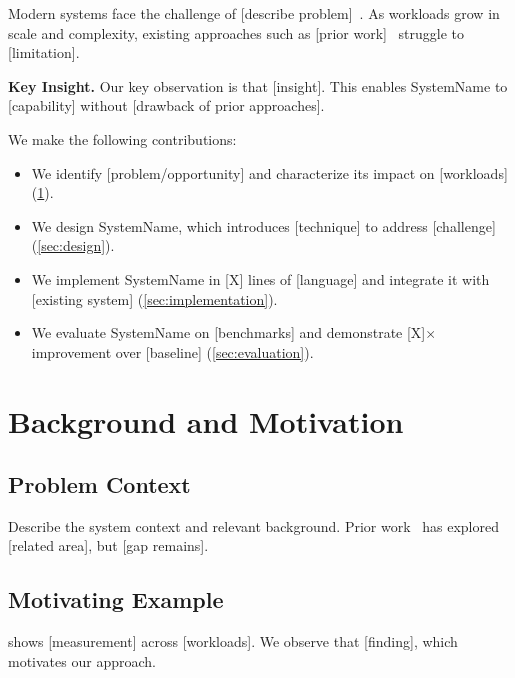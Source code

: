 \documentclass[letterpaper,twocolumn,10pt]{article}
\newcommand{\system}{SystemName\xspace}
\newcommand{\para}[1]{\smallskip\noindent\textbf{#1.}}
\begin{document}
Modern systems face the challenge of [describe problem]~\cite{dean2004mapreduce}.
As workloads grow in scale and complexity, existing approaches such as
[prior work]~\cite{abadi2016tensorflow} struggle to [limitation].

\para{Key Insight}
Our key observation is that [insight]. This enables \system to [capability]
without [drawback of prior approaches].

We make the following contributions:
\begin{itemize}
  \item We identify [problem/opportunity] and characterize its impact
        on [workloads] (\cref{sec:background}).
  \item We design \system, which introduces [technique] to address
        [challenge] (\cref{sec:design}).
  \item We implement \system in [X] lines of [language] and integrate
        it with [existing system] (\cref{sec:implementation}).
  \item We evaluate \system on [benchmarks] and demonstrate [X]$\times$
        improvement over [baseline] (\cref{sec:evaluation}).
\end{itemize}

\section{Background and Motivation}
\label{sec:background}


\subsection{Problem Context}

Describe the system context and relevant background.
Prior work~\cite{moritz2018ray, zaharia2012spark} has explored [related area],
but [gap remains].

\subsection{Motivating Example}

 shows [measurement] across [workloads].
We observe that [finding], which motivates our approach.
\end{document}

